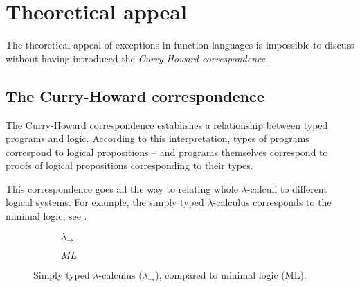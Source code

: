 

\section{Theoretical appeal}

The theoretical appeal of exceptions in function languages is impossible to discuss
without having introduced the \emph{Curry-Howard correspondence}.

\subsection{The Curry-Howard correspondence}

The Curry-Howard correspondence establishes a relationship between typed programs and logic.
According to this interpretation, types of programs correspond to logical propositions --
and programs themselves correspond to proofs of logical propositions corresponding to their
types.

This correspondence goes all the way to relating whole $\lambda$-calculi to different
logical systems. For example, the simply typed $\lambda$-calculus corresponds to the minimal
logic, see .

\begin{figure}
\centering
\begin{subfigure}[b]{0.45\textwidth}
\begin{prooftree}
\end{prooftree}
\begin{prooftree}
\end{prooftree}
\begin{prooftree}
\end{prooftree}

\caption{$\lambda_\to$}
\end{subfigure}
%
\begin{subfigure}[b]{0.45\textwidth}
\begin{prooftree}
\end{prooftree}
\begin{prooftree}
\end{prooftree}
\begin{prooftree}
\end{prooftree}
\caption{$ML$}
\end{subfigure}

\caption{Simply typed $\lambda$-calculus ($\lambda_\to$), compared to minimal logic (ML).}
\label{fig:stlc-ml}
\end{figure}

